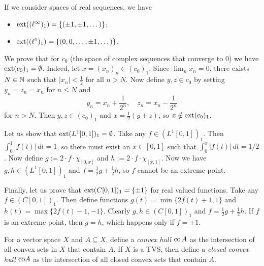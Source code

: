 \begin{example}
  If we consider spaces of real sequences, we have
  \begin{itemize}
    \item $\operatorname{ext} ((\ell^\infty)_1) = \{(\pm 1, \pm 1, \dots)\}$;
    \item $\operatorname{ext} ((\ell^1)_1) = \{(0, 0, \dots, \pm 1, \dots)\}$.
  \end{itemize} 
\end{example}

\begin{example}
  We prove that for $c_0$ (the space of complex sequences that converge to $0$) we have $\operatorname{ext} (c_0)_1 = \emptyset$. 
  Indeed, let $x = (x_n)_n \in (c_0)_1$.
  Since $\lim_n x_n = 0$, there exists $N \in \mathbb {N}$ such that $|x_n| < \frac{1}{2}$ for all $n > N$.
  Now define $y, z \in c_0$ by setting $y_n = z_n = x_n$ for $n \leq N$
  and $$y_n = x_n + \frac{1}{2^n},\quad z_n = x_n - \frac{1}{2^n}$$ 
  for $n > N$. Then $y, z \in (c_0)_1$ and $x = \frac{1}{2} (y + z)$, so $x \notin \operatorname{ext} (c_0)_1$.
\end{example}

\begin{example}
  Let us show that $\operatorname{ext} (L^1 [0, 1])_1 = \emptyset$. Take any $f \in (L^1 [0, 1])_1$.
  Then $\int _0 ^1 |f(t)| \, dt = 1$, so there must exist an $x \in [0, 1]$ such that 
  $\int _0 ^x |f(t)| \, dt = 1/2$. Now define 
  $g := 2 \cdot f \cdot \chi_{[0, x]}$ and $h := 2 \cdot f \cdot \chi_{[x, 1]}$. 
  Now we have $g, h \in (L^1 [0, 1])_1$ and $f = \frac{1}{2}g + \frac{1}{2} h$, so $f$ cannot be an extreme point.
\end{example}

\begin{example}
  Finally, let us prove that $\operatorname{ext} (C[0, 1])_1 = \{\pm 1\}$ for real valued functions.
  Take any $f \in (C[0, 1])_1$. Then define functions $g(t) = \min \{2f(t) + 1, 1\}$ and $h(t) = \max \{2 f(t) - 1, -1\}$.
  Clearly $g, h \in (C[0, 1])_1$ and $f = \frac{1}{2} g + \frac{1}{2} h$. If $f$ is an extreme point, then $g = h$, which happens only if $f = \pm 1$.
\end{example}

\begin{definition}
  For a vector space $X$ and $A \subseteq X$, define a \emph{convex hull} $\operatorname{co} A$ as the intersection of all convex sets in $X$ that contain $A$.
  If $X$ is a TVS, then define a \emph{closed convex hull} $\overline{\operatorname{co}} A$ as the intersection of all closed convex sets that contain $A$.
\end{definition}

